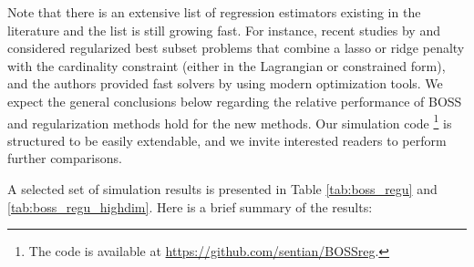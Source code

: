 Note that there is an extensive list of regression estimators existing in the literature and the list is still growing fast. For instance, recent studies by \citet{hazimeh2020fast} and \citet{bertsimas2020sparse} considered regularized best subset problems that combine a lasso or ridge penalty with the cardinality constraint (either in the Lagrangian or constrained form), and the authors provided fast solvers by using modern optimization tools. We expect the general conclusions below regarding the relative performance of BOSS and regularization methods hold for the new methods. Our simulation code \footnote{The code is available at \url{https://github.com/sentian/BOSSreg}.} is structured to be easily extendable, and we invite interested readers to perform further comparisons.


A selected set of simulation results is presented in Table \ref{tab:boss_regu} and \ref{tab:boss_regu_highdim}. Here is a brief summary of the results:


